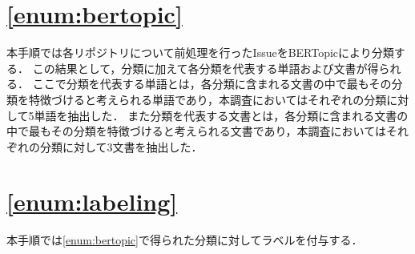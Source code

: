 \documentclass[main]{subfiles}
\begin{document}
\section{\ref{enum:bertopic}}

本手順では各リポジトリについて前処理を行ったIssueをBERTopicにより分類する．
この結果として，分類に加えて各分類を代表する単語および文書が得られる．
ここで分類を代表する単語とは，各分類に含まれる文書の中で最もその分類を特徴づけると考えられる単語であり，本調査においてはそれぞれの分類に対して5単語を抽出した．
また分類を代表する文書とは，各分類に含まれる文書の中で最もその分類を特徴づけると考えられる文書であり，本調査においてはそれぞれの分類に対して3文書を抽出した．

\section{\ref{enum:labeling}}

本手順では\ref{enum:bertopic}で得られた分類に対してラベルを付与する．
\end{document}

